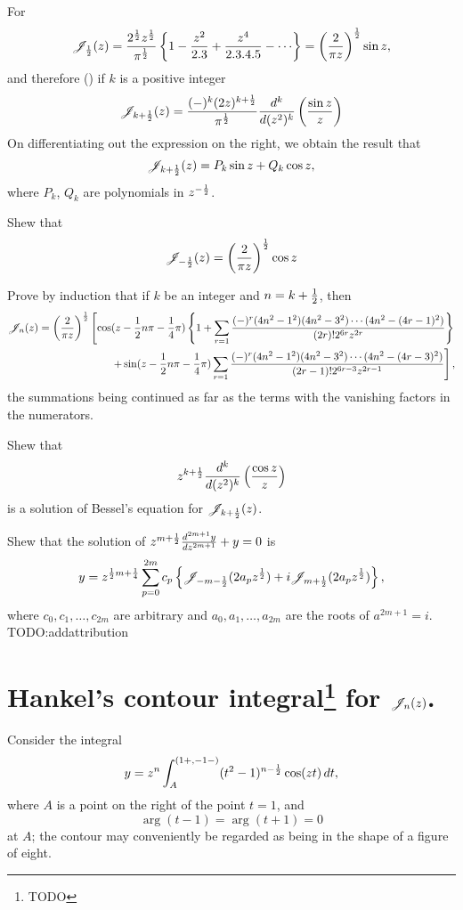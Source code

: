 \documentclass{book}
\begin{document}
For 
$$
\besJ_{\half}(z) 
= 
\frac{2^{\half} z^{\half}}{\pi^{\half}}
\thebrace{ 1
  - \frac{z^2}{2.3}
  + \frac{z^4}{2.3.4.5}
  - \cdots
}
= \theparen{ \frac{2}{\pi z}  }^{\half}
\sin z,
$$
and therefore () if $k$ is a
positive integer
$$
\mathscr{J}_{k+\frac{1}{2}}(z)
=
\frac{(-)^k (2z)^{k+\frac{1}{2}}}{\pi^{\frac{1}{2}}}
\frac{d^k}{d (z^2)^k}
\left(  \frac{\sin z}{z}   \right)
$$
On differentiating out the expression on the right, we obtain the
result that
$$
\mathscr{J}_{k+\frac{1}{2}}(z) = P_k \sin z + Q_k \cos z,
$$
where $P_k$, $Q_k$ are polynomials in $z^{-\frac{1}{2}}$.
\begin{wandwexample}
  Shew that
  $$
  \mathscr{J}_{-\frac{1}{2}}(z) = \left(  \frac{2}{\pi z} \right)^{\frac{1}{2}} \cos z
  $$
\end{wandwexample}
%
%
\begin{wandwexample}
  Prove by induction that if $k$ be an integer and $n = k + \frac{1}{2}$,
  then
  \begin{align*}
    \mathscr{J}_n(z)
    =
    \left( \frac{2}{\pi z} \right)^{\frac{1}{2}}
    \left[
      \cos(z - \frac{1}{2} n \pi - \frac{1}{4}\pi)
      \left\{ 
        1
        +
        \sum_{r=1}
        \frac{(-)^r (4n^2-1^2)(4n^2-3^2)\cdots(4n^2-(4r-1)^2)}{(2r)! 2^{6r} z^{2r}}
         \right\}
      \right.
      \\
      \left.
      +
      \sin(z - \frac{1}{2} n \pi - \frac{1}{4}\pi)
      \sum_{r=1}
      \frac{(-)^r (4n^2-1^2)(4n^2-3^2)\cdots(4n^2-(4r-3)^2)}{(2r-1)!
        2^{6r-3} z^{2r-1}}
      \right],
    \end{align*}
    the summations being continued as far as the terms with the
    vanishing factors in the numerators.
\end{wandwexample}
\begin{wandwexample}
  Shew that
  $$
  z^{k+\frac{1}{2}} \frac{d^k}{d (z^2)^k} \left( \frac{\cos z}{z} \right)
  $$
  is a solution of Bessel's equation for $\mathscr{J}_{k+\frac{1}{2}}(z)$.
\end{wandwexample}
\begin{wandwexample}
  Shew that the solution of
  $
  z^{m+\frac{1}{2}} \frac{d^{2m+1} y}{dz^{2m+1}} + y = 0
  $
  is
  $$
  y
  =
  z^{\frac{1}{2} m + \frac{1}{4}}
  \sum_{p=0}^{2m}
  c_p
  \left\{  \mathscr{J}_{-m-\frac{1}{2}}(2a_pz^{\frac{1}{2}}) + i\mathscr{J}_{m+\frac{1}{2}}(2a_pz^{\frac{1}{2}}) \right\},
  $$
  where
  $c_0,c_1,\ldots,c_{2m}$ are arbitrary and
  $a_0,a_1,\ldots,a_{2m}$ are the roots of
  $a^{2m+1}=i$. TODO:addattribution
\end{wandwexample}
\section[Hankel's contour integral for $\besJ_n(z)$.]{Hankel's contour integral\footnote{TODO} for $\besJ_n(z)$.}
Consider the integral
$$
y = z^n \int_A^{(1+,-1-)} (t^2-1)^{n-\frac{1}{2}} \cos(zt) \, d t,
$$
where $A$ is a point on the right of the point $t=1$, and
$$
\arg(t-1) = \arg(t+1) = 0
$$
at $A$; the contour may conveniently be regarded as being in the shape
of a figure of eight.
\end{document}
